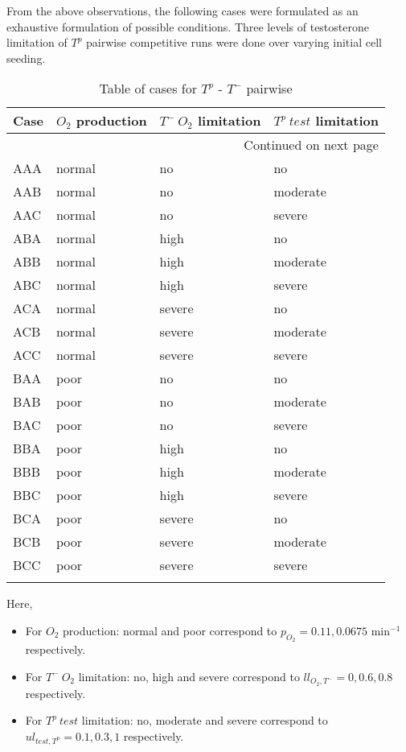 From the above observations, the following cases were formulated as an exhaustive formulation of possible conditions. Three levels of testosterone limitation of $T^p$
pairwise competitive runs were done over varying initial cell seeding.
\begin{longtable}[c]{|l|l|l|l|}

  \hline \multicolumn{1}{|c|}{\textbf{Case}} & \multicolumn{1}{c|}{\textbf{$O_2$ production}} & \multicolumn{1}{c|}{\textbf{$T^-\ O_2$ limitation}} & \multicolumn{1}{c|}{\textbf{$T^p\ test$ limitation}}\\ \hline
  \endhead

  \hline \multicolumn{4}{|r|}{{Continued on next page}} \\ \hline
  \endfoot

  \endlastfoot

  AAA & normal & no & no \\ \hline
  AAB & normal & no & moderate \\ \hline
  AAC & normal & no & severe \\ \hline
  ABA & normal & high & no \\ \hline
  ABB & normal & high & moderate \\ \hline
  ABC & normal & high & severe \\ \hline
  ACA & normal & severe & no \\ \hline
  ACB & normal & severe & moderate \\ \hline
  ACC & normal & severe & severe \\ \hline
  BAA & poor & no & no \\ \hline
  BAB & poor & no & moderate \\ \hline
  BAC & poor & no & severe \\ \hline
  BBA & poor & high & no \\ \hline
  BBB & poor & high & moderate \\ \hline
  BBC & poor & high & severe \\ \hline
  BCA & poor & severe & no \\ \hline
  BCB & poor & severe & moderate \\ \hline
  BCC & poor & severe & severe \\ \hline

  \caption{Table of cases for $T^p$ - $T^-$ pairwise}
  \label{tab_Tpro-Tneg_cases}
\end{longtable}

Here,
\begin{itemize}
  \item For $O_2$ production: normal and poor correspond to $p_{O_2}=0.11, 0.0675$ min$^{-1}$ respectively.
  \item For $T^-\ O_2$ limitation: no, high and severe correspond to $ll_{O_2,T^-}=0, 0.6, 0.8$ respectively.
  \item For $T^p\ test$ limitation: no, moderate and severe correspond to $ul_{test,T^p}=0.1, 0.3, 1$ respectively.
\end{itemize}


